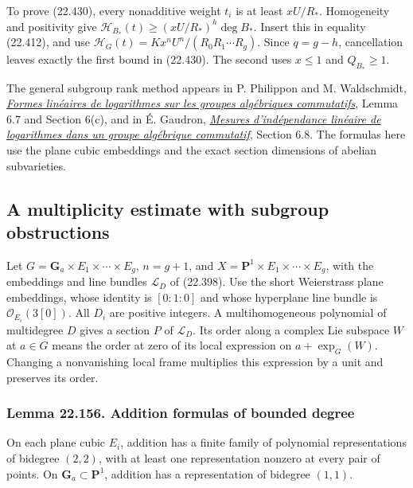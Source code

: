 \documentclass[
  11pt,
  a4paper,
]{article}
\begin{document}
To prove (22.430), every nonadditive weight \(t_i\) is at least
\(xU/R_*\). Homogeneity and positivity give
\(\mathcal H_{B_*}(t)\ge(xU/R_*)^h\deg B_*\). Insert this in equality
(22.412), and use \(\mathcal H_G(t)=Kx^nU^n/(R_0R_1\cdots R_g)\). Since
\(q=g-h\), cancellation leaves exactly the first bound in (22.430). The
second uses \(x\le1\) and \(Q_{B_*}\ge1\).

The general subgroup rank method appears in P. Philippon and M.
Waldschmidt,
\href{https://webusers.imj-prg.fr/~michel.waldschmidt/articles/pdf/ProjectEuclid/IllinoisJM32-1988.pdf}{\emph{Formes
linéaires de logarithmes sur les groupes algébriques commutatifs}},
Lemma 6.7 and Section 6(c), and in É. Gaudron,
\href{https://lmbp.uca.fr/~gaudron/art4.pdf}{\emph{Mesures
d'indépendance linéaire de logarithmes dans un groupe algébrique
commutatif}}, Section 6.8. The formulas here use the plane cubic
embeddings and the exact section dimensions of abelian subvarieties.

\subsection{A multiplicity estimate with subgroup
obstructions}\label{a-multiplicity-estimate-with-subgroup-obstructions}

Let \(G=\mathbf G_a\times E_1\times\cdots\times E_g\), \(n=g+1\), and
\(X=\mathbf P^1\times E_1\times\cdots\times E_g\), with the embeddings
and line bundles \(\mathcal L_D\) of (22.398). Use the short Weierstrass
plane embeddings, whose identity is \([0:1:0]\) and whose hyperplane
line bundle is \(\mathcal O_{E_i}(3[0])\). All \(D_i\) are positive
integers. A multihomogeneous polynomial of multidegree \(D\) gives a
section \(P\) of \(\mathcal L_D\). Its order along a complex Lie
subspace \(W\) at \(a\in G\) means the order at zero of its local
expression on \(a+\exp_G(W)\). Changing a nonvanishing local frame
multiplies this expression by a unit and preserves its order.

\subsubsection{Lemma 22.156. Addition formulas of bounded
degree}\label{lemma-22.156.-addition-formulas-of-bounded-degree}

On each plane cubic \(E_i\), addition has a finite family of polynomial
representations of bidegree \((2,2)\), with at least one representation
nonzero at every pair of points. On \(\mathbf G_a\subset\mathbf P^1\),
addition has a representation of bidegree \((1,1)\).
\end{document}
